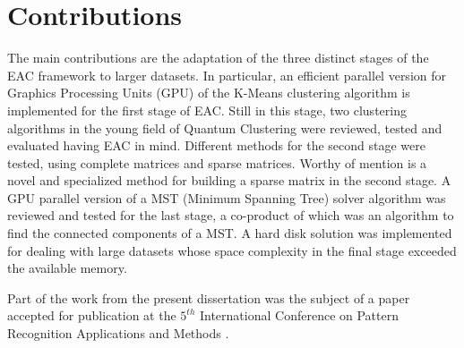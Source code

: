 \section{Contributions}
The main contributions are the adaptation of the three distinct stages of the EAC framework to larger datasets.
In particular, an efficient parallel version for Graphics Processing Units (GPU) of the K-Means clustering algorithm is implemented for the first stage of EAC.
Still in this stage, two clustering algorithms in the young field of Quantum Clustering were reviewed, tested and evaluated having EAC in mind. %
Different methods for the second stage were tested, using complete matrices and sparse matrices.%
Worthy of mention is a novel and specialized method for building a sparse matrix in the second stage. %
A GPU parallel version of a MST (Minimum Spanning Tree) solver algorithm was reviewed and tested for the last stage, a co-product of which was an algorithm to find the connected components of a MST.
A hard disk solution was implemented for dealing with large datasets whose space complexity in the final stage exceeded the available memory.


Part of the work from the present dissertation was the subject of a paper accepted for publication at the $5^{th}$ International Conference on Pattern Recognition Applications and Methods \cite{Silva2016}.





